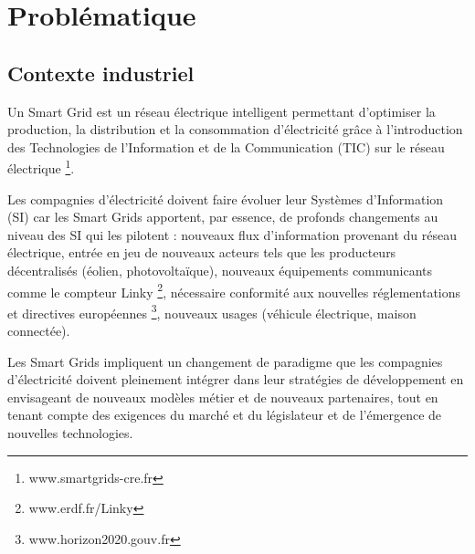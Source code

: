 \section{Problématique}

\subsection{Contexte industriel}

Un Smart Grid est un réseau électrique intelligent permettant d'optimiser la production, la distribution et la consommation d'électricité grâce à l'introduction des Technologies de l'Information et de la Communication (TIC) sur le réseau électrique \footnote{www.smartgrids-cre.fr}.

Les compagnies d'électricité doivent faire évoluer leur Systèmes d'Information (SI) car les Smart Grids apportent, par essence, de profonds changements au niveau des SI qui les pilotent  : nouveaux flux d'information provenant du réseau électrique, entrée en jeu de nouveaux acteurs tels que les producteurs décentralisés (éolien, photovoltaïque), nouveaux équipements communicants comme le compteur Linky \footnote{www.erdf.fr/Linky}, nécessaire conformité aux nouvelles réglementations et directives européennes \footnote{www.horizon2020.gouv.fr}, nouveaux usages (véhicule électrique, maison connectée). 

Les Smart Grids impliquent un changement de paradigme que les compagnies d'électricité doivent pleinement intégrer dans leur stratégies de développement en envisageant de nouveaux modèles métier et de nouveaux partenaires, tout en tenant compte des exigences du marché et du législateur et de l'émergence de nouvelles technologies. 

